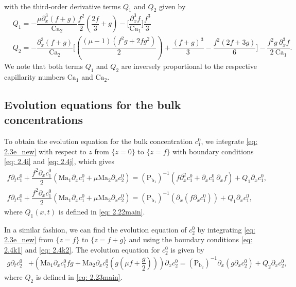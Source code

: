\documentclass[11pt]{article}
\numberwithin{equation}{section}
\newtheorem{counter example}[theorem]{Counter Example}
\begin{document}
{\begin{align}
\end{align}
with the third-order derivative terms  $Q_1$ and $Q_2$ 
given by
\begin{align}\label{eq: 2.22main}
    &Q_1=-\dfrac{\mu \partial_{x}^3(f+g)}{\mathrm{Ca_2}}\dfrac{f^2}{2}\left(\dfrac{2f}{3}+g\right)-\bigg[\dfrac{\partial_{x}^3 f}{\mathrm{Ca_1}}\bigg]\dfrac{f^3}{3}\\
&Q_2=-\dfrac{\partial_{x}^3(f+g)}{\mathrm{Ca_2}}\bigg[\left(\dfrac{(\mu-1)(f^2 g+2fg^2)}{2}\right)+\dfrac{(f+g)^3}{3}-\dfrac{f^2(2f+3g)}{6}\bigg]-\dfrac{f^2 g~ \partial_{x}^3 f}{2~\mathrm{Ca_1}}.\label{eq: 2.23main}
\end{align}
We note that both terms $Q_1$ and $Q_2$ are inversely proportional to the respective capillarity numbers  $\mathrm{Ca_1}$   and $\mathrm{Ca_2}$.
\subsection{Evolution equations for the bulk concentrations}
To obtain the  evolution equation for %
the bulk concentration $c_1^0$, we integrate \eqref{eq: 2.3e_new} with respect to $z$ from $\{z=0\}$ to $\{z=f\}$ with boundary conditions \eqref{eq: 2.4i} and \eqref{eq: 2.4j}, which gives
\begin{align}\label{eq: 2.34main}
  f\partial_t c_1^0+\dfrac{f^2 \partial_x c_1^0}{2}\left(\mathrm{Ma_1} \partial_x c_1^0+\mu \mathrm{Ma_2}\partial_x c_2^0\right)=(\mathrm{P_{b_1}})^{-1}\left(f\partial_x^2 c_1^0+\partial_x c_1^0~\partial_x f\right)+Q_1 \partial_x c_1^0,\nonumber\\
 f\partial_t c_1^0+\dfrac{f^2 \partial_x c_1^0}{2}\left(\mathrm{Ma_1} \partial_x c_1^0+\mu \mathrm{Ma_2}\partial_x c_2^0\right)=(\mathrm{P_{b_1}})^{-1}\left(\partial_x(f\partial_x c_1^0)\right)+ Q_1\partial_x c_1^0,
\end{align}
where $Q_1(x, t)$ is defined in \eqref{eq: 2.22main}.

In a similar fashion, we can find the evolution equation of $c_2^0$ by integrating \eqref{eq: 2.3e_new} from $\{z=f\}$ to $\{z=f+g\}$ and using the boundary conditions \eqref{eq: 2.4k1} and \eqref{eq: 2.4k2}. The evolution equation for $c_2^0$ is given by
\begin{align}\label{eq: 2.35main}
  g\partial_t c_2^0&+\left(\mathrm{Ma_1} \partial_x c_1^0fg+\mathrm{Ma_2}\partial_x c_2^0\left(g(\mu f+\dfrac{g}{2})\right)\right) \partial_x c_2^0=(\mathrm{P_{b_2}})^{-1}\partial_x\left(g\partial_x c_2^0\right)+Q_2\partial_x c_2^0,
\end{align}
where $Q_2$ is defined in \eqref{eq: 2.23main}.
}
\end{document}
